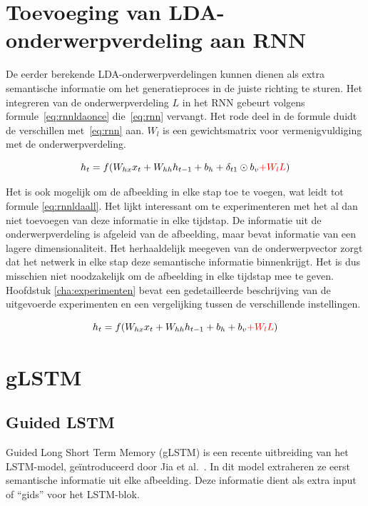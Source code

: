 \section{Toevoeging van LDA-onderwerpverdeling aan RNN}
De eerder berekende LDA-onderwerpverdelingen kunnen dienen als extra semantische informatie om het generatieproces in de juiste richting te sturen. Het integreren van de onderwerpverdeling $L$ in het RNN gebeurt volgens formule~\eqref{eq:rnnldaonce} die~\eqref{eq:rnn} vervangt. Het rode deel in de formule duidt de verschillen met~\eqref{eq:rnn} aan. $W_l$ is een gewichtsmatrix voor vermenigvuldiging met de onderwerpverdeling.

\begin{equation}
    h_t = f(W_{hx} x_{t} + W_{hh} h_{t-1} + b_h + \delta_{t1} \odot b_v \color{red}{+W_lL}\color{black})
    \label{eq:rnnldaonce}
\end{equation}

Het is ook mogelijk om de afbeelding in elke stap toe te voegen, wat leidt tot formule \eqref{eq:rnnldaall}. Het lijkt interessant om te experimenteren met het al dan niet toevoegen van deze informatie in elke tijdstap. De informatie uit de onderwerpverdeling is afgeleid van de afbeelding, maar bevat informatie van een lagere dimensionaliteit. Het herhaaldelijk meegeven van de onderwerpvector zorgt dat het netwerk in elke stap deze semantische informatie binnenkrijgt. Het is dus misschien niet noodzakelijk om de afbeelding in elke tijdstap mee te geven. Hoofdstuk \ref{cha:experimenten} bevat een gedetailleerde beschrijving van de uitgevoerde experimenten en een vergelijking tussen de verschillende instellingen.

\begin{equation}
    h_t = f(W_{hx} x_{t} + W_{hh} h_{t-1} + b_h + b_v \color{red}{+W_lL}\color{black})
    \label{eq:rnnldaall}
\end{equation}


\section{gLSTM}
\subsection{Guided LSTM}
Guided Long Short Term Memory (gLSTM) is een recente uitbreiding van het LSTM-model, ge\"introduceerd door Jia et al.~\cite{Fernando2015}. In dit model extraheren ze eerst semantische informatie uit elke afbeelding. Deze informatie dient als extra input of ``gids'' voor het LSTM-blok.

